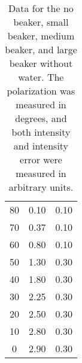 \begin{table}[H]
\begin{center}
{\begin{tabular}{ccc}
			80 & 0.10 & 0.10 \\
			70 & 0.37 & 0.10 \\
			60 & 0.80 & 0.10 \\
			50 & 1.30 & 0.30 \\
			40 & 1.80 & 0.30 \\
			30 & 2.25 & 0.30 \\
			20 & 2.50 & 0.30 \\
			10 & 2.80 & 0.30 \\
			0 & 2.90 & 0.30 \\
			\bottomrule
		\end{tabular}}
	\end{center}
	\caption{Data for the no beaker, small beaker, medium beaker, and large beaker without water. The polarization was measured in degrees, and both intensity and intensity error were measured in arbitrary units.}
	\label{tab:no_water}
\end{table}

